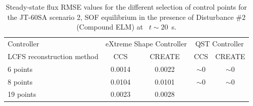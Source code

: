 \begin{table}[]
	\centering
	\begin{tabular}{|l|c|c|c|c|}
		\hline
		\rowcolor{color2}
		\multicolumn{5}{|c|}{\textbf{Disturbance $\#2$ (Compound ELM) flux RMSE steady state      ~ ~ Wb/2$\pi$}}                                                                 \\ \hline
		\rowcolor{color1}
		Controller                 & \multicolumn{2}{c|}{eXtreme Shape Controller} & \multicolumn{2}{c|}{QST Controller}                 \\ \hline
		LCFS reconstruction method & CCS                   & CREATE                & CCS                      & CREATE                   \\ \hline
		6 points                   & 0.0014                & 0.0022                & $\sim 0$               & $\sim 0$                  \\ \hline
		8 points                   & 0.0104                & 0.0101                & $\sim 0$                 & $\sim 0$                  \\ \hline
		19 points                  & 0.0023                & 0.0028                & \cellcolor[HTML]{C0C0C0} & \cellcolor[HTML]{C0C0C0} \\ \hline
	\end{tabular}
	\caption{Steady-state flux RMSE values for the different selection of control points for  the JT-60SA scenario 2, SOF equilibrium in the presence of  Disturbance $\# 2$ (Compound ELM) at ~$t\sim 20 $~s. }
	\label{fluxRMSE_cmpELM_table}
\end{table}

